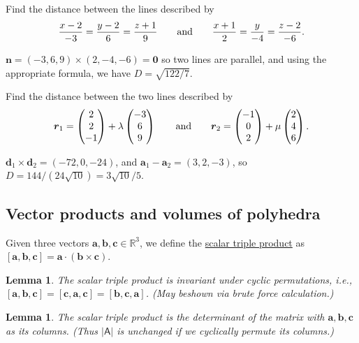 \documentclass[10pt,notitlepage]{revtex4-1}
\newtheorem{lemma}[theorem]{Lemma}
\newenvironment{example}[1][Example]{\begin{trivlist}
\item[\hskip \labelsep {\bfseries #1}]}{\end{trivlist}}
\newcommand{\ab}{{\boldsymbol{a}}}
\newcommand{\bb}{{\boldsymbol{b}}}
\newcommand{\cb}{{\boldsymbol{c}}}
\newcommand{\db}{{\boldsymbol{d}}}
\newcommand{\nb}{{\boldsymbol{n}}}
\begin{document}
\begin{example}
	Find the distance between the lines described by
	\begin{equation}
		\frac{x-2}{-3}=\frac{y-2}{6}=\frac{z+1}{9}\qquad\textnormal{and}\qquad
		\frac{x+1}{2}=\frac{y}{-4}=\frac{z-2}{-6}.
	\end{equation}
	
	$\nb=(-3,6,9)\times(2,-4,-6)=\boldsymbol{0}$ so two lines are parallel, and
	using the appropriate formula, we have $D=\sqrt{122/7}$.
\end{example}
\begin{example}
	Find the distance between the two lines described by
	\begin{equation}
		\boldsymbol{r}_1=\begin{pmatrix}2\\2\\-1\end{pmatrix}
		+\lambda\begin{pmatrix}-3\\6\\9\end{pmatrix}\qquad\textnormal{and}\qquad
		\boldsymbol{r}_2=\begin{pmatrix}-1\\0\\2\end{pmatrix}
		+\mu\begin{pmatrix}2\\4\\6\end{pmatrix}.
	\end{equation}
	
	$\db_1\times\db_2=(-72,0,-24)$, and $\ab_1-\ab_2=(3,2,-3)$, so
	$D=144/(24\sqrt{10})=3\sqrt{10}/5$.
\end{example}


\subsection{Vector products and volumes of polyhedra}

Given three vectors $\ab,\bb,\cb\in\mathbb{R}^3$, we define the
\underline{scalar triple product} as $[\ab,\bb,\cb]=\ab\cdot(\bb\times\cb)$.
\begin{lemma}
	The scalar triple product is invariant under cyclic permutations, i.e.,
	$[\ab,\bb,\cb]=[\cb,\ab,\cb]=[\bb,\cb,\ab]$. (May beshown via brute force
	calculation.)
\end{lemma}
\begin{lemma}
	The scalar triple product is the determinant of the matrix with
	$\ab,\bb,\cb$ as its columns. (Thus $|\mathsf{A}|$ is unchanged if we
	cyclically permute its columns.)
\end{lemma}
\end{document}
